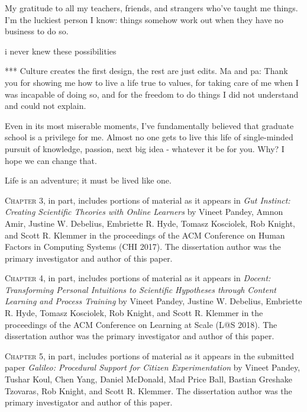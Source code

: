 \begin{frontmatter}
\begin{acknowledgements}
My gratitude to all my teachers, friends, and strangers who’ve taught me things. I’m the luckiest person I know: things somehow work out when they have no business to do so.


i never knew these possibilities 

***
Culture creates the first design, the rest are just edits. Ma and pa: Thank you for showing me how to live a life true to values, for taking care of me when I was incapable of doing so, and for the freedom to do things I did not understand and could not explain. 


Even in its most miserable moments, I’ve fundamentally believed that graduate school is a privilege for me. Almost no one gets to live this life of single-minded pursuit of knowledge, passion, next big idea - whatever it be for you. Why? I hope we can change that. 

Life is an adventure; it must be lived like one. 

 




\vspace{0.25in}

\textsc{Chapter 3}, in part, includes portions of material as it appears in \emph{Gut Instinct: Creating Scientific Theories with Online Learners} by Vineet Pandey, Amnon Amir, Justine W. Debelius, Embriette R. Hyde, Tomasz Kosciolek, Rob Knight, and Scott R. Klemmer in the proceedings of the ACM Conference on Human Factors in Computing Systems (CHI 2017). The dissertation author was the primary investigator and author of this paper.

\textsc{Chapter 4}, in part, includes portions of material as it appears in \emph{Docent: Transforming Personal Intuitions to Scientific Hypotheses through Content Learning and Process Training} by Vineet Pandey, Justine W. Debelius, Embriette R. Hyde, Tomasz Kosciolek, Rob Knight, and Scott R. Klemmer in the proceedings of the ACM Conference on Learning at Scale (L@S 2018). The dissertation author was the primary investigator and author of this paper.

\textsc{Chapter 5}, in part, includes portions of material as it appears in  the submitted paper \emph{Galileo: Procedural Support for Citizen Experimentation} by Vineet Pandey, Tushar Koul, Chen Yang, Daniel McDonald, Mad Price Ball, Bastian Greshake Tzovaras, Rob Knight, and Scott R. Klemmer. The dissertation author was the primary investigator and author of this paper.

\end{acknowledgements}


\end{frontmatter}
